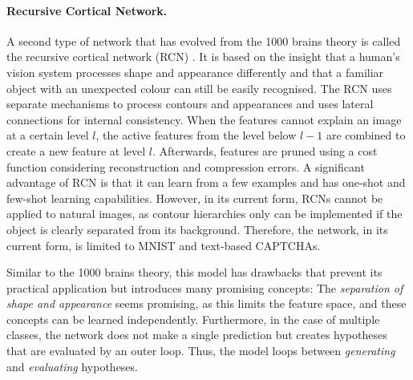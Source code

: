 \paragraph{Recursive Cortical Network.} A second type of network that has evolved from the 1000 brains theory is called the recursive cortical network (RCN) . It is based on the insight that a human's vision system processes shape and appearance differently  and that a familiar object with an unexpected colour can still be easily recognised.
The RCN uses separate mechanisms to process contours and appearances and uses lateral connections  for internal consistency.
When the features cannot explain an image at a certain level $l$, the active features from the level below $l-1$ are combined to create a new feature at level $l$. Afterwards, features are pruned using a cost function considering reconstruction and compression errors.
A significant advantage of RCN is that it can learn from a few examples and has one-shot and few-shot learning capabilities.
However, in its current form, RCNs cannot be applied to natural images, as contour hierarchies only can be implemented if the object is clearly separated from its background. Therefore, the network, in its current form, is limited to MNIST  and text-based CAPTCHAs.

Similar to the 1000 brains theory, this model has drawbacks that prevent its practical application but introduces many promising concepts: The \emph{separation of shape and appearance} seems promising, as this limits the feature space, and these concepts can be learned independently. Furthermore, in the case of multiple classes, the network does not make a single prediction but creates hypotheses that are evaluated by an outer loop. Thus, the model loops between \emph{generating} and \emph{evaluating} hypotheses.

